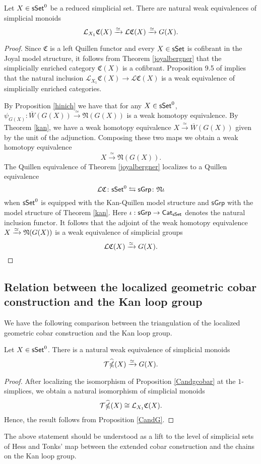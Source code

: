 \begin{proposition}\label{CandG} Let $X \in \mathsf{sSet}^0$ be a reduced simplicial set. There are natural weak equivalences of simplicial monoids
$$\mathcal{L}_{X_1} \mathfrak{C}(X) \xrightarrow{\simeq} \mathcal{L}\mathfrak{C}(X) \xrightarrow{\simeq} G(X).$$
\end{proposition}

\begin{proof}
Since $\mathfrak{C}$ is a left Quillen functor and every $X \in \mathsf{sSet}$ is cofibrant in the Joyal model structure, it follows from Theorem \ref{joyalbergner} that the simplicially enriched category $\mathfrak{C}(X)$ is a cofibrant. Proposition 9.5 of \cite{dwyer1980simplicial} implies that the natural inclusion $\mathcal{L}_{X_1} \mathfrak{C}(X) \to \mathcal{L}\mathfrak{C}(X)$ is a weak equivalence of simplicially enriched categories. 

By Proposition \ref{hinich} we have that for any $X \in \mathsf{sSet}^0$, $\psi_{G(X)}: \overline{W}(G(X)) \xrightarrow{\simeq} \mathfrak{N}(G(X))$ is a weak homotopy equivalence. By Theorem \ref{kan}, we have a weak homotopy equivalence $X \xrightarrow{\simeq} \overline{W}(G(X))$ given by the unit of the adjunction. Composing these two maps we obtain a weak homotopy equivalence
$$X \xrightarrow{\simeq} \mathfrak{N}(G(X)).$$ 
The Quillen equivalence of Theorem \ref{joyalbergner} localizes to a Quillen equivalence
$$\mathcal{L} \mathfrak{C} \colon \mathsf{sSet}^0 \leftrightarrows \mathsf{sGrp} \colon \mathfrak{N}\iota$$
when $\mathsf{sSet}^0$ is equipped with the Kan-Quillen model structure and $\mathsf{sGrp}$ with the model structure of Theorem \ref{kan}. Here $\iota: \mathsf{sGrp} \to \mathsf{Cat}_{\mathsf{sSet}}$ denotes the natural inclusion functor. It follows that the adjoint of the weak homotopy equivalence $X \xrightarrow{\simeq} \mathfrak{N}(G(X))$ is a weak equivalence of simplicial groups
$$\mathcal{L}\mathfrak{C}(X) \xrightarrow{\simeq} G(X).$$ 
\end{proof}


\subsection{Relation between the localized geometric cobar construction and the Kan loop group}

We have the following comparison between the triangulation of the localized geometric cobar construction and the Kan loop group. 
\begin{corollary}\label{widehatgcobarandG} Let $X \in \mathsf{sSet}^0$. There is a natural weak equivalence of simplicial monoids
$$\mathcal{T} \widehat{\operatorname{\mathbb{\Omega}}}(X) \xrightarrow{\simeq}G(X).$$
\end{corollary}
\begin{proof} After localizing the isomorphism of Proposition \ref{Candgcobar} at the $1$-simplices, we obtain a natural isomorphism of simplicial monoids $$\mathcal{T} \widehat{\operatorname{\mathbb{\Omega}}}(X) \cong \mathcal{L}_{X_1}\mathfrak{C}(X).$$ Hence, the result follows from Proposition \ref{CandG}. 
\end{proof}
The above statement should be understood as a lift to the level of simplicial sets of Hess and Tonks' map between the extended cobar construction and the chains on the Kan loop group.

